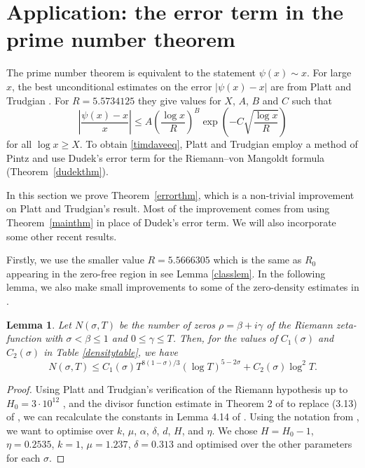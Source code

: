 \documentclass[reqno]{amsart}
\newtheorem{lemma}[theorem]{Lemma}
\numberwithin{equation}{section}
\theoremstyle{remark}
\begin{document}
\section{Application: the error term in the prime number theorem}\label{errorsect}
The prime number theorem is equivalent to the statement $\psi(x)\sim x$. For large $x$, the best unconditional estimates on the error $|\psi(x)-x|$ are from Platt and Trudgian \cite[Theorem 1]{P_T_2021}. For $R=5.5734125$ they give values for $X$, $A$, $B$ and $C$ such that
\begin{equation}\label{timdaveeq}
    \left|\frac{\psi(x)-x}{x}\right|\leq A\left(\frac{\log x}{R}\right)^B\exp\left(-C\sqrt{\frac{\log x}{R}}\right)
\end{equation}
for all $\log x\geq X$. To obtain \eqref{timdaveeq}, Platt and Trudgian employ a method of Pintz \cite{Pintz_80} and use Dudek's error term for the Riemann--von Mangoldt formula (Theorem~\ref{dudekthm}).

In this section we prove Theorem~\ref{errorthm}, which is a non-trivial improvement on Platt and Trudgian's result. Most of the improvement comes from using Theorem~\ref{mainthm} in place of Dudek's error term. We will also incorporate some other recent results. 

Firstly, we use the smaller value $R=5.5666305$ which is the same as $R_0$ appearing in the zero-free region in see Lemma \ref{classlem}. In the following lemma, we also make small improvements to some of the zero-density estimates in \cite{K_L_N_2018}.

\begin{lemma}\label{densitylemma}
    Let $N(\sigma,T)$ be the number of zeros $\rho=\beta+i\gamma$ of the Riemann zeta-function with $\sigma<\beta\leq 1$ and $0\leq\gamma\leq T$. Then, for the values of $C_1(\sigma)$ and $C_2(\sigma)$ in Table \ref{densitytable}, we have
    \begin{equation*}
        N(\sigma,T)\leq C_1(\sigma)T^{8(1-\sigma)/3}(\log T)^{5-2\sigma}+C_2(\sigma)\log^2T.
    \end{equation*}
\end{lemma}
\begin{proof}
    Using Platt and Trudgian's verification of the Riemann hypothesis up to $H_0=3\cdot 10^{12}$ \cite{P_T-RH_21}, and the divisor function estimate in Theorem 2 of \cite{C_T_19} to replace (3.13) of \cite{K_L_N_2018}, we can recalculate the constants in Lemma 4.14 of \cite{K_L_N_2018}. Using the notation from \cite{K_L_N_2018}, we want to optimise over $k$, $\mu$, $\alpha$, $\delta$, $d$, $H$, and $\eta$. We chose $H = H_0 - 1$, $\eta=0.2535$, $k=1$, $\mu = 1.237$, $\delta = 0.313$ and optimised over the other parameters for each $\sigma$.
\end{proof}
\end{document}
